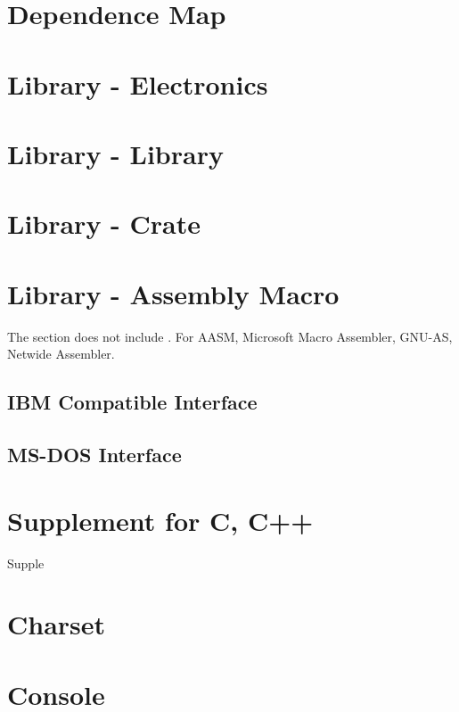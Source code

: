 \section{Dependence Map}

\section{Library \mbox{-} Electronics}

\section{Library \mbox{-}  Library}

\section{Library \mbox{-}  Crate}

\section{Library \mbox{-} Assembly Macro}

The section does not include . For AASM, Microsoft Macro Assembler, GNU-AS, Netwide Assembler.


\subsection{IBM Compatible Interface}

\subsection{MS-DOS Interface}

\section{Supplement for C, C++}
{Supple}

\section{Charset}


\section{Console}


